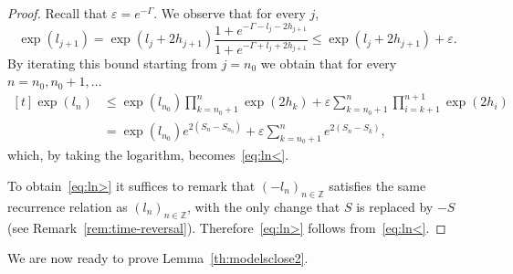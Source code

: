 \documentclass[AHL,Unicode,longabstracts,published]{cedram}
\newcommand{\bbZ}{\mathbb{Z}}
\newcommand{\gep}{\varepsilon}
\newcommand{\gG}{\Gamma}
\begin{document}
\begin{proof}
Recall that $\gep= e^{-\gG}$. We observe that for every $j$,
\begin{equation}
\exp \left(l_{j+1}\right)
= \exp \left(l_{j} + 2h_{j+1}\right) \frac{1+ e^{-\gG -l_j-2h_{j+1}}}{1+ e^{-\gG +l_j+2h_{j+1}}}
\le \exp \left(l_{j}+ 2h_{j+1}\right)+ \gep.
\end{equation}
By iterating this bound starting from $j=n_0$ we obtain that for every $n=n_0, n_0+1, \dots$
\begin{equation}
\begin{aligned}[t]
\exp \left(l_{n}\right) &\le \exp \left(l_{n_0}\right)\prod_{k={n_0}+1}^{n} \exp(2h_k) +\gep \sum_{k={n_0}+1}^{n} \prod_{i=k+1}^{n+1} \exp(2h_i)
\\ &=  \exp \left(l_{n_0}\right) e^{2\left(S_{n}-S_{n_0}\right)}+\gep \sum_{k={n_0}+1}^{n} e^{2(S_{n}-S_k)},
\end{aligned}
\end{equation}
which, by taking the logarithm, becomes~\eqref{eq:ln<}.


To obtain~\eqref{eq:ln>} it suffices to remark that $(-l_n)_{n\in\bbZ}$ satisfies the same recurrence relation as $(l_n)_{n\in\bbZ}$, with the only change that $S$ is replaced by $-S$ (see Remark~\ref{rem:time-reversal}). Therefore~\eqref{eq:ln>} follows from~\eqref{eq:ln<}.
\end{proof}


We are now ready to prove Lemma~\ref{th:modelsclose2}.
\end{document}
